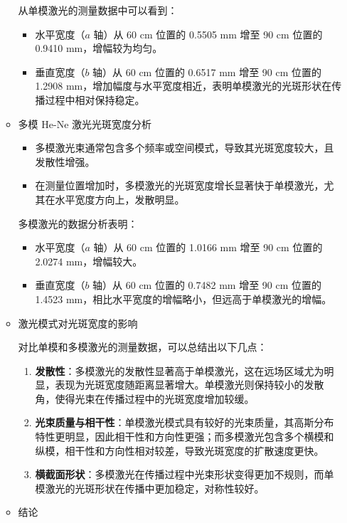 \begin{enumerate}
\begin{itemize}
		从单模激光的测量数据中可以看到：
		\begin{itemize}
			\item 水平宽度（\(a\) 轴）从 60 cm 位置的 0.5505 mm 增至 90 cm 位置的 0.9410 mm，增幅较为均匀。
			\item 垂直宽度（\(b\) 轴）从 60 cm 位置的 0.6517 mm 增至 90 cm 位置的 1.2908 mm，增加幅度与水平宽度相近，表明单模激光的光斑形状在传播过程中相对保持稳定。
		\end{itemize}
		
		\item 多模 He-Ne 激光光斑宽度分析
		\begin{itemize}
			\item 多模激光束通常包含多个频率或空间模式，导致其光斑宽度较大，且发散性增强。
			\item 在测量位置增加时，多模激光的光斑宽度增长显著快于单模激光，尤其在水平宽度方向上，发散明显。
		\end{itemize}
		
		多模激光的数据分析表明：
		\begin{itemize}
			\item 水平宽度（\(a\) 轴）从 60 cm 位置的 1.0166 mm 增至 90 cm 位置的 2.0274 mm，增幅较大。
			\item 垂直宽度（\(b\) 轴）从 60 cm 位置的 0.7482 mm 增至 90 cm 位置的 1.4523 mm，相比水平宽度的增幅略小，但远高于单模激光的增幅。
		\end{itemize}
		
		\item 激光模式对光斑宽度的影响
		
		对比单模和多模激光的测量数据，可以总结出以下几点：
		
		\begin{enumerate}
			\item \textbf{发散性}：多模激光的发散性显著高于单模激光，这在远场区域尤为明显，表现为光斑宽度随距离显著增大。单模激光则保持较小的发散角，使得光束在传播过程中的光斑宽度增加较缓。
			\item \textbf{光束质量与相干性}：单模激光模式具有较好的光束质量，其高斯分布特性更明显，因此相干性和方向性更强；而多模激光包含多个横模和纵模，相干性和方向性相对较差，导致光斑宽度的扩散速度更快。
			\item \textbf{横截面形状}：多模激光在传播过程中光束形状变得更加不规则，而单模激光的光斑形状在传播中更加稳定，对称性较好。
		\end{enumerate}
		
		\item 结论
		

\end{itemize}
\end{enumerate}
